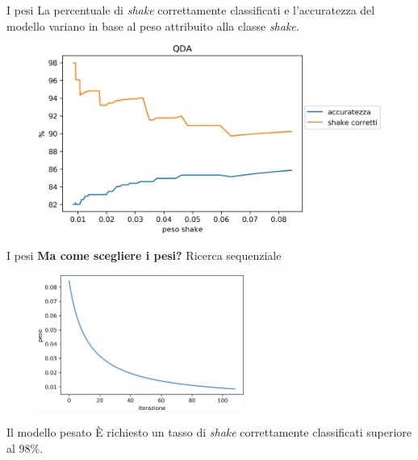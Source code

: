 \documentclass{beamer}
\begin{document}
\begin{frame}{I pesi}
La percentuale di \emph{shake} correttamente classificati e l\rq{}accuratezza del modello variano in base al peso attribuito alla classe \emph{shake}.
\begin{figure}[H]
\includegraphics[width=\textwidth]{../figure/acc-vs-veripos-qda.png}
\end{figure}
\end{frame}

\begin{frame}{I pesi}
\textbf{Ma come scegliere i pesi?} \pause Ricerca sequenziale

\begin{figure}[H]
\includegraphics[width=0.6\textwidth]{../figure/andamento-pesi.png}
\end{figure}

\end{frame}

\begin{frame}{Il modello pesato}
È richiesto un tasso di {\em shake} correttamente classificati 
superiore al $98\%$.
\pause

\end{frame}
\end{document}
